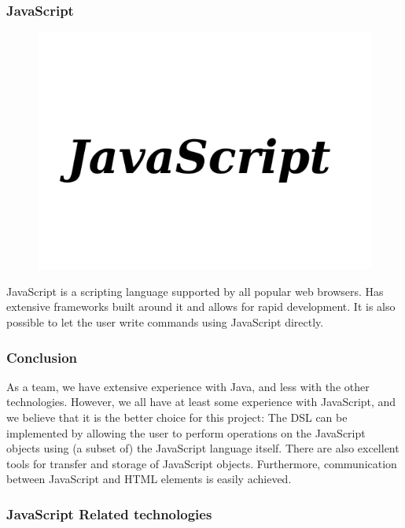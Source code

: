 \subsubsection{JavaScript}

\begin{figure}
\vspace{-20pt}
\centering
\includegraphics[width=.14\textwidth]{image/javascript-logo.png}
\end{figure}


JavaScript is a scripting language supported by all popular web browsers. Has extensive frameworks built around it and allows for rapid development. It is also possible to let the user write commands using JavaScript directly.

\subsubsection{Conclusion}
As a team, we have extensive experience with Java, and less with the other technologies. However, we all have at least some experience with JavaScript, and we believe that it is the better choice for this project: The DSL can be implemented by allowing the user to perform operations on the JavaScript objects using (a subset of) the JavaScript language itself. There are also excellent tools for transfer and storage of JavaScript objects. Furthermore, communication between JavaScript and HTML elements is easily achieved.

\subsubsection{JavaScript Related technologies}

